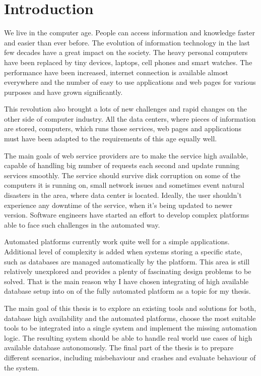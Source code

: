 \documentclass[
  digital, %
  twoside, %
  table,   %
  lof,     %
  lot,     %
]{fithesis3}
\begin{document}
\chapter{Introduction}

We live in the computer age. People can access information and knowledge faster and easier than ever before. The evolution of information technology in the last few decades have a great impact on the society. The heavy personal computers have been replaced by tiny devices, laptops, cell phones and smart watches. The performance have been increased, internet connection is available almost everywhere and the number of easy to use applications and web pages for various purposes and have grown significantly.

This revolution also brought a lots of new challenges and rapid changes on the other side of computer industry. All the data centers, where pieces of information are stored, computers, which runs those services, web pages and applications must have been adapted to the requirements of this age equally well.

The main goals of web service providers are to make the service high available, capable of handling big number of requests each second and update running services smoothly. The service should survive disk corruption on some of the computers it is running on, small network issues and sometimes event natural disasters in the area, where data center is located. Ideally, the user shouldn't experience any downtime of the service, when it's being updated to newer version. Software engineers have started an effort to develop complex platforms able to face such challenges in the automated way.

Automated platforms currently work quite well for a simple applications. Additional level of complexity is added when  systems storing a specific state, such as databases are managed automatically by the platform. This area is still relatively unexplored and provides a plenty of fascinating design problems to be solved. That is the main reason why I have chosen integrating of high available database setup into on of the fully automated platform as a topic for my thesis.

The main goal of this thesis is to explore an existing tools and solutions for both, database high availability and the automated platforms, choose the most suitable tools to be integrated into a single system and implement the missing automation logic. The resulting system should be able to handle real world use cases of high available database autonomously. The final part of the thesis is to prepare different scenarios, including misbehaviour and crashes and evaluate behaviour of the system.
\end{document}
